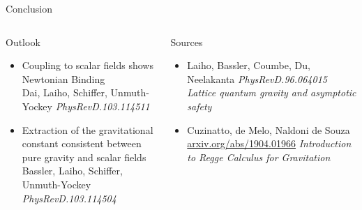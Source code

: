 
\begin{frame}{Conclusion}
 \begin{columns}
  \begin{column}{0.57\textwidth}
   \begin{block}{Outlook}
    \vspace{0pt}
    \begin{itemize}
     \item Coupling to scalar fields shows Newtonian Binding\\
     {\tiny{Dai, Laiho, Schiffer, Unmuth-Yockey \emph{PhysRevD.103.114511}}}
     \item Extraction of the gravitational constant consistent between pure gravity and scalar fields\\
     {\tiny{Bassler, Laiho, Schiffer, Unmuth-Yockey \emph{PhysRevD.103.114504}}}
    \end{itemize}
   \end{block}
  \end{column}
  \begin{column}{0.42\textwidth}
   \begin{block}{Sources}
    \begin{itemize}
      \item Laiho, Bassler, Coumbe, Du, Neelakanta \emph{PhysRevD.96.064015}\\
            \emph{Lattice quantum gravity and asymptotic safety}
      \item Cuzinatto, de Melo, Naldoni de Souza \url{arxiv.org/abs/1904.01966}
            \emph{Introduction to Regge Calculus for Gravitation}
    \end{itemize}
   \end{block}
  \end{column}
 \end{columns}
\end{frame}
